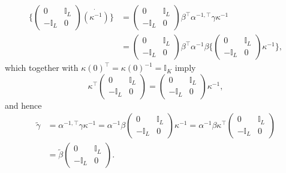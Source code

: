 \documentclass[12pt,a4paper]{article}
\begin{document}
\begin{align*}
\bigg\{ \begin{pmatrix}
0 & \mathbb{I}_L \\ -\mathbb{I}_L & 0
\end{pmatrix} \dot{(\kappa^{-1})} \bigg\} &= \begin{pmatrix}
0 & \mathbb{I}_L \\ -\mathbb{I}_L & 0
\end{pmatrix} \beta^\top \alpha^{-1,\top} \gamma \kappa^{-1} \\
&= \begin{pmatrix}
0 & \mathbb{I}_L \\ -\mathbb{I}_L & 0
\end{pmatrix} \beta^\top \alpha^{-1} \beta
\bigg\{ \begin{pmatrix}
0 & \mathbb{I}_L \\ -\mathbb{I}_L & 0
\end{pmatrix} \kappa^{-1} \bigg\},
\end{align*}
which together with $\kappa(0)^\top = \kappa(0)^{-1} = \mathbb{I}_K $ imply
\begin{equation*}
\kappa^\top \begin{pmatrix}
0 & \mathbb{I}_L \\ -\mathbb{I}_L & 0
\end{pmatrix} = \begin{pmatrix}
0 & \mathbb{I}_L \\ -\mathbb{I}_L & 0
\end{pmatrix} \kappa^{-1},
\end{equation*}
and hence
\begin{align*}
\tilde{\gamma} &= \alpha^{-1,\top} \gamma \kappa^{-1} 
= \alpha^{-1} \beta \begin{pmatrix}
0 & \mathbb{I}_L \\ -\mathbb{I}_L & 0
\end{pmatrix} \kappa^{-1}
= \alpha^{-1} \beta \kappa^\top \begin{pmatrix}
0 & \mathbb{I}_L \\ -\mathbb{I}_L & 0
\end{pmatrix} \\
&= \tilde{\beta} \begin{pmatrix}
0 & \mathbb{I}_L \\ -\mathbb{I}_L & 0
\end{pmatrix}.
\end{align*}
\end{document}
